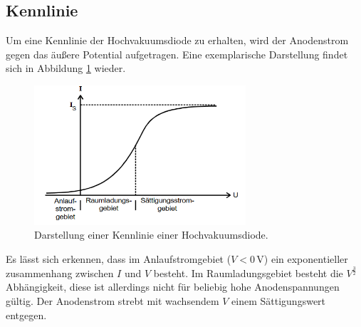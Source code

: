 \subsection{Kennlinie}
Um eine Kennlinie der Hochvakuumsdiode zu erhalten, wird der Anodenstrom gegen das äußere Potential
aufgetragen. Eine exemplarische Darstellung findet sich in Abbildung \ref{fig:kennlinie} wieder.
\begin{figure}
 \centering
 \includegraphics[width=0.7\textwidth]{kennlinie.png}
 \caption{Darstellung einer Kennlinie einer Hochvakuumsdiode.\cite{sample}}
 \label{fig:kennlinie}
 \end{figure}
Es lässt sich erkennen, dass im Anlaufstromgebiet ($V<0\,\si{\volt}$) ein exponentieller zusammenhang
zwischen $I$ und $V$ besteht. Im Raumladungsgebiet besteht die $V^{\frac{3}{2}}$ Abhängigkeit, diese ist
allerdings nicht für beliebig hohe Anodenspannungen gültig. Der Anodenstrom strebt mit wachsendem $V$
einem Sättigungswert entgegen.

